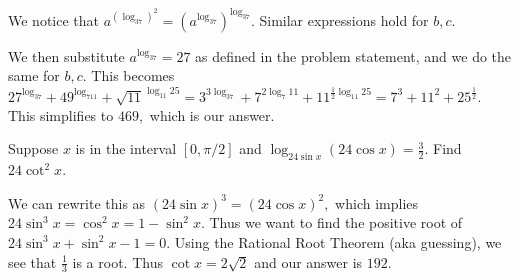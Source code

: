 \begin{sol} We notice that $a^{(\log_37)^2}=(a^{\log_37})^{\log_37}.$ Similar expressions hold for $b,c.$

We then substitute $a^{\log_37}=27$ as defined in the problem statement, and we do the same for $b,c$. This becomes $27^{\log_37}+49^{\log_711}+\sqrt{11}^{\log_{11}25}=3^{3\log_37}+7^{2\log_7{11}}+11^{\frac{1}{2}\log_{11}25}=7^3+11^2+25^{\frac{1}{2}}.$ This simplifies to $469,$ which is our answer.\end{sol}
    
\begin{exam}[AIME I 2011/9]
Suppose $x$ is in the interval $[0, \pi/2]$ and $\log_{24\sin x} (24\cos x)=\frac{3}{2}$. Find $24\cot^2 x$.
\end{exam}
    
\begin{sol}
We can rewrite this as $(24\sin x)^3=(24\cos x)^2,$ which implies $24\sin^3 x=\cos^2 x=1-\sin^2 x.$ Thus we want to find the positive root of $24\sin^3 x+\sin^2 x-1=0.$ Using the Rational Root Theorem (aka guessing), we see that $\frac{1}{3}$ is a root. Thus $\cot x=2\sqrt{2}$ and our answer is $192.$\end{sol}